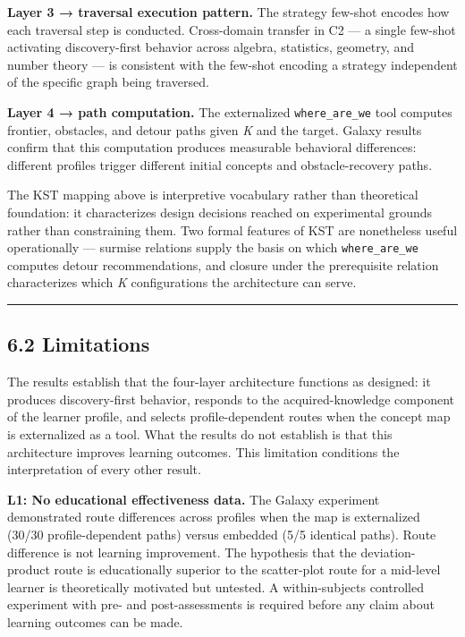 \documentclass[
]{article}
\newcounter{none} %
\begin{document}
\textbf{Layer 3 → traversal execution pattern.} The strategy few-shot encodes how each traversal step is conducted. Cross-domain transfer in C2 --- a single few-shot activating discovery-first behavior across algebra, statistics, geometry, and number theory --- is consistent with the few-shot encoding a strategy independent of the specific graph being traversed.

\textbf{Layer 4 → path computation.} The externalized \texttt{where\_are\_we} tool computes frontier, obstacles, and detour paths given \emph{K} and the target. Galaxy results confirm that this computation produces measurable behavioral differences: different profiles trigger different initial concepts and obstacle-recovery paths.

The KST mapping above is interpretive vocabulary rather than theoretical foundation: it characterizes design decisions reached on experimental grounds rather than constraining them. Two formal features of KST are nonetheless useful operationally --- surmise relations supply the basis on which \texttt{where\_are\_we} computes detour recommendations, and closure under the prerequisite relation characterizes which \emph{K} configurations the architecture can serve.

\begin{center}\rule{0.5\linewidth}{0.5pt}\end{center}

\subsection{6.2 Limitations}\label{62-limitations}

The results establish that the four-layer architecture functions as designed: it produces discovery-first behavior, responds to the acquired-knowledge component of the learner profile, and selects profile-dependent routes when the concept map is externalized as a tool. What the results do not establish is that this architecture improves learning outcomes. This limitation conditions the interpretation of every other result.

\textbf{L1: No educational effectiveness data.} The Galaxy experiment demonstrated route differences across profiles when the map is externalized (30/30 profile-dependent paths) versus embedded (5/5 identical paths). Route difference is not learning improvement. The hypothesis that the deviation-product route is educationally superior to the scatter-plot route for a mid-level learner is theoretically motivated but untested. A within-subjects controlled experiment with pre- and post-assessments is required before any claim about learning outcomes can be made.
\end{document}

